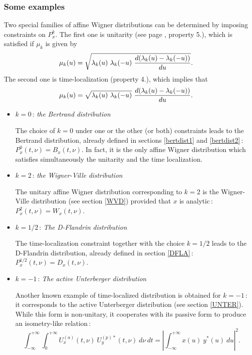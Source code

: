 \subsubsection{Some examples}

  Two special families of affine Wigner distributions can be determined by
imposing constraints on $P_x^k$. The first one is unitarity (see page
\pageref{propunit}, property 5.), which is satisfied if $\mu_k$ is
given by
\[\mu_k(u)=\sqrt{\lambda_k(u)\ \lambda_k(-u)\
{d(\lambda_k(u)-\lambda_k(-u))\over du}}.\] 
The second one is time-localization (property 4.), which implies that
\[\mu_k(u)=\sqrt{\lambda_k(u)\ \lambda_k(-u)}\
{d(\lambda_k(u)-\lambda_k(-u))\over du}.\] 

\begin{itemize}
\item $k=0$\,: {\it the Bertrand distribution}

  The choice of $k=0$ under one or the other (or both) constraints leads
to the Bertrand distribution, already defined in sections \ref{bertdist1}
and \ref{bertdist2}\,: $P_x^0(t,\nu)=B_x(t,\nu)$. In fact, it is the only
affine Wigner distribution which satisfies simultaneously the unitarity and
the time localization.

\item $k=2$\,: {\it the Wigner-Ville distribution}

  The unitary affine Wigner distribution corresponding to $k=2$ is the
Wigner-Ville distribution (see section \ref{WVD}) provided that $x$ is
analytic\,: $P_x^2(t,\nu)=W_x(t,\nu)$.

\item $k=1/2$\,: {\it The D-Flandrin distribution}

  The time-localization constraint together with the choice $k=1/2$ leads to
the D-Flandrin distribution, already defined in section \ref{DFLA}\,:
$P_x^{1/2}(t,\nu)=D_x(t,\nu)$.

\item $k=-1$\,: {\it The active Unterberger distribution}

  Another known example of time-localized distribution is obtained for
$k=-1$\,: it corresponds to the active Unterberger distribution (see section
\ref{UNTER}). While this form is non-unitary, it cooperates with its passive
form to produce an isometry-like relation\,:
\[\int_{-\infty}^{+\infty} \int_0^{+\infty} U^{(a)}_x(t,\nu)\
U^{(p)*}_y(t,\nu)\ d\nu\ dt = \left|\int_{-\infty}^{+\infty} x(u)\ y^*(u)\
du\right|^2.\] 
 

\end{itemize}
